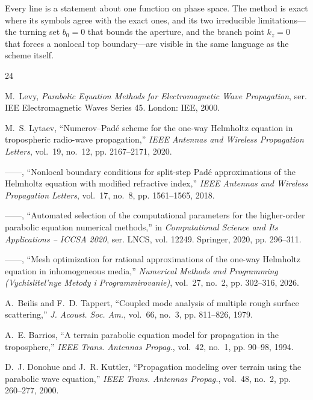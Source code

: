 \documentclass[11pt]{article}
\begin{document}
Every line is a statement about one function on phase space. The method is
exact where its symbols agree with the exact ones, and its two irreducible
limitations---the turning set $b_0=0$ that bounds the aperture, and the
branch point $k_z=0$ that forces a nonlocal top boundary---are visible in the
same language as the scheme itself.

\begin{thebibliography}{24}

M.~Levy, \emph{Parabolic Equation Methods for Electromagnetic Wave
  Propagation}, ser. IEE Electromagnetic Waves Series 45. London: IEE, 2000.

M.~S. Lytaev, ``{Numerov--Pad\'e} scheme for the one-way {Helmholtz} equation
  in tropospheric radio-wave propagation,'' \emph{IEEE Antennas and Wireless
  Propagation Letters}, vol.~19, no.~12, pp. 2167--2171, 2020.

------, ``Nonlocal boundary conditions for split-step {Pad\'e} approximations
  of the {Helmholtz} equation with modified refractive index,'' \emph{IEEE
  Antennas and Wireless Propagation Letters}, vol.~17, no.~8, pp. 1561--1565,
  2018.

------, ``Automated selection of the computational parameters for the
  higher-order parabolic equation numerical methods,'' in \emph{Computational
  Science and Its Applications -- ICCSA 2020}, ser. LNCS, vol. 12249.
  Springer, 2020, pp. 296--311.

------, ``Mesh optimization for rational approximations of the one-way
  {Helmholtz} equation in inhomogeneous media,'' \emph{Numerical Methods and
  Programming (Vychislitel'nye Metody i Programmirovanie)}, vol.~27, no.~2,
  pp. 302--316, 2026.

A.~Beilis and F.~D. Tappert, ``Coupled mode analysis of multiple rough surface
  scattering,'' \emph{J. Acoust. Soc. Am.}, vol.~66, no.~3, pp. 811--826, 1979.

A.~E. Barrios, ``A terrain parabolic equation model for propagation in the
  troposphere,'' \emph{IEEE Trans. Antennas Propag.}, vol.~42, no.~1,
  pp. 90--98, 1994.

D.~J. Donohue and J.~R. Kuttler, ``Propagation modeling over terrain using the
  parabolic wave equation,'' \emph{IEEE Trans. Antennas Propag.}, vol.~48,
  no.~2, pp. 260--277, 2000.


\end{thebibliography}
\end{document}
